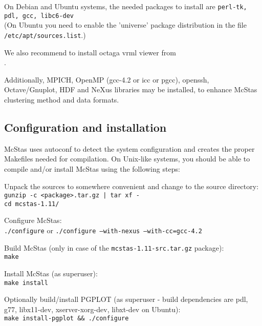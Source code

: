 \noindent On Debian and Ubuntu systems, the
needed packages to install are \texttt{perl-tk, pdl, gcc,
  libc6-dev} \\(On Ubuntu you need to enable the 'universe' package
distribution in the file \\\verb+/etc/apt/sources.list+.)

\noindent We also recommend to install octaga vrml viewer from
\\.

\noindent Additionally, MPICH, OpenMP (gcc-4.2 or icc or pgcc), openssh, Octave/Gnuplot, HDF and NeXus libraries may be installed, to enhance McStas clustering method and data formats.

\subsection{Configuration and installation}
McStas uses autoconf to detect the system configuration and creates the
proper Makefiles needed for compilation. On Unix-like systems, you
should be able to compile and/or install McStas using the following steps:
\begin{enumerate}
\item{Unpack the sources to somewhere convenient and change to the
    source directory:\\
  \texttt{gunzip -c <package>.tar.gz | tar xf -}\\
  \texttt{cd mcstas-1.11/}}
\item{Configure McStas:\\
  \texttt{./configure} or \texttt{./configure --with-nexus --with-cc=gcc-4.2}}
\item{Build McStas (only in case of the \verb+mcstas-1.11-src.tar.gz+ package):\\
  \texttt{make}}
\item{Install McStas (as superuser):\\
  \texttt{make install}
\item{Optionally build/install PGPLOT (as superuser - build
    dependencies are pdl, g77, libx11-dev, xserver-xorg-dev, libxt-dev
    on Ubuntu):\\
    \texttt{make install-pgplot \&\& ./configure}
    \label{pg_install}}

\label{makeinst}}
\end{enumerate}



